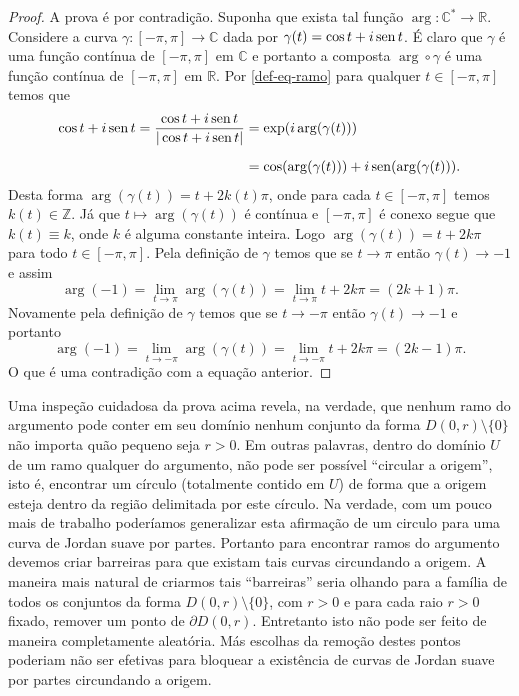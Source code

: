 \begin{proof}
A prova é por contradição. Suponha que exista tal função $\arg:\mathbb{C}^{*}\to\mathbb{R}$. 
Considere a curva $\gamma:[-\pi,\pi]\to\mathbb{C}$ dada por 
$\gamma(t)=\cos t+i\operatorname{sen} t$. É claro que $\gamma$ é uma função contínua
de $[-\pi,\pi]$ em $\mathbb{C}$ e portanto a composta $\arg\circ \gamma$ é uma função 
contínua de $[-\pi,\pi]$ em $\mathbb{R}$. Por \eqref{def-eq-ramo} para qualquer 
$t\in [-\pi,\pi]$ temos que 
\begin{align*}
\cos t+i\operatorname{sen} t = \frac{\cos t+i\operatorname{sen} t}{|\cos t+i\operatorname{sen} t|}
&=
\exp(i\arg(\gamma(t)))
\\[0.2cm]
&=
\cos(\arg(\gamma(t)))+ i\operatorname{sen}(\arg(\gamma(t))).
\end{align*}
Desta forma $\arg(\gamma(t))=t+2k(t)\pi$, onde para cada $t\in [-\pi,\pi]$ 
temos $k(t)\in\mathbb{Z}$. Já que $t\longmapsto \arg(\gamma(t))$ é 
contínua e $[-\pi,\pi]$ é conexo segue que $k(t)\equiv k$, 
onde $k$ é alguma constante inteira. Logo $\arg(\gamma(t))=t+2k\pi$
para todo $t\in [-\pi,\pi]$. 
Pela definição de $\gamma$ temos que se $t\to \pi$ então $\gamma(t)\to -1$
e assim 
\[
\arg(-1) = \lim_{t\to \pi} \arg(\gamma(t)) = \lim_{t\to \pi} t+2k\pi = (2k+1)\pi.
\] 
Novamente pela definição de $\gamma$ temos que se $t\to-\pi$ então 
$\gamma(t)\to -1$ e portanto 
\[
\arg(-1) = \lim_{t\to -\pi} \arg(\gamma(t)) = \lim_{t\to -\pi} t+2k\pi = (2k-1)\pi.
\]
O que é uma contradição com a equação anterior.
\end{proof}

\bigskip 


Uma inspeção cuidadosa da prova acima revela, na verdade, que nenhum ramo do argumento 
pode conter em seu domínio nenhum conjunto da forma $D(0,r)\setminus\{0\}$ 
não importa quão pequeno 
seja $r>0$.
Em outras palavras, dentro do domínio $U$ de um ramo qualquer do argumento, não pode ser 
possível ``circular a origem'', isto é, encontrar um círculo (totalmente contido em $U$) 
de forma que a origem esteja dentro da região delimitada por este círculo. 
Na verdade, com um pouco mais de trabalho poderíamos generalizar esta afirmação de
um circulo para uma curva de Jordan suave por partes. Portanto para encontrar ramos
do argumento devemos criar barreiras para que existam tais curvas circundando a origem.
A maneira mais natural de criarmos tais ``barreiras''
seria olhando para a família de todos os conjuntos da 
forma $D(0,r)\setminus\{0\}$, com $r>0$ e para cada raio $r>0$ fixado, 
remover um ponto de $\partial D(0,r)$. Entretanto isto não pode ser feito 
de maneira completamente aleatória. Más escolhas da remoção destes pontos poderiam
não ser efetivas para bloquear a existência de curvas de Jordan suave por partes
circundando a origem. 

